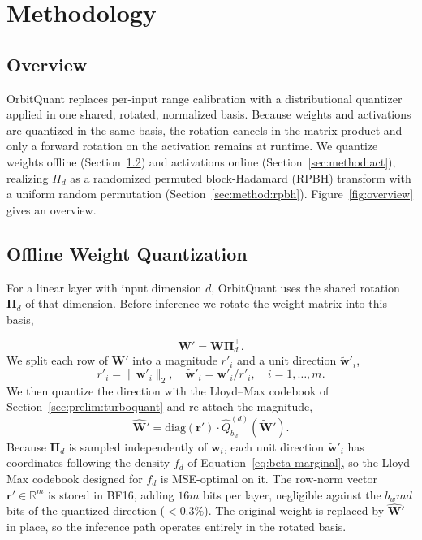\vspace{-1mm}
\section{Methodology}
\label{sec:method}
\vspace{-2mm}
\subsection{Overview}
\label{sec:method:overview}
\vspace{-1mm}
OrbitQuant replaces per-input range calibration with a distributional quantizer applied in one shared, rotated, normalized basis. Because weights and activations are quantized in the same basis, the rotation cancels in the matrix product and only a forward rotation on the activation remains at runtime. We quantize weights offline (Section~\ref{sec:method:weight}) and activations online (Section~\ref{sec:method:act}), realizing $\Pi_d$ as a randomized permuted block-Hadamard (RPBH) transform with a uniform random permutation (Section~\ref{sec:method:rpbh}). Figure~\ref{fig:overview} gives an overview.

\vspace{-1mm}
\subsection{Offline Weight Quantization}
\label{sec:method:weight}
For a linear layer with input dimension $d$, OrbitQuant uses the shared rotation $\boldsymbol{\Pi}_d$ of that dimension. Before inference we rotate the weight matrix into this basis,

\begin{equation}
\mathbf{W}' = \mathbf{W}\boldsymbol{\Pi}_d^\top.
\label{eq:weight-rotate}
\end{equation}
We split each row of $\mathbf{W}'$ into a magnitude $r'_i$ and a unit direction $\tilde{\mathbf{w}}'_i$,
\begin{equation}
r'_i = \|\mathbf{w}'_i\|_2, \quad \tilde{\mathbf{w}}'_i = \mathbf{w}'_i / r'_i, \quad i = 1, \ldots, m.
\label{eq:weight-norm}
\end{equation}
We then quantize the direction with the Lloyd--Max codebook of Section~\ref{sec:prelim:turboquant} and re-attach the magnitude,
\begin{equation}
\hat{\mathbf{W}}' = \mathrm{diag}(\mathbf{r}') \cdot \hat{Q}_{b_w}^{(d)}(\tilde{\mathbf{W}}').
\label{eq:weight-quant}
\end{equation}
Because $\boldsymbol{\Pi}_d$ is sampled independently of $\mathbf{w}_i$, each unit direction $\tilde{\mathbf{w}}'_i$ has coordinates following the density $f_d$ of Equation~\eqref{eq:beta-marginal}, so the Lloyd--Max codebook designed for $f_d$ is MSE-optimal on it. The row-norm vector $\mathbf{r}' \in \mathbb{R}^m$ is stored in BF16, adding $16m$ bits per layer, negligible against the $b_w m d$ bits of the quantized direction ($<0.3\%$). The original weight is replaced by $\hat{\mathbf{W}}'$ in place, so the inference path operates entirely in the rotated basis.


